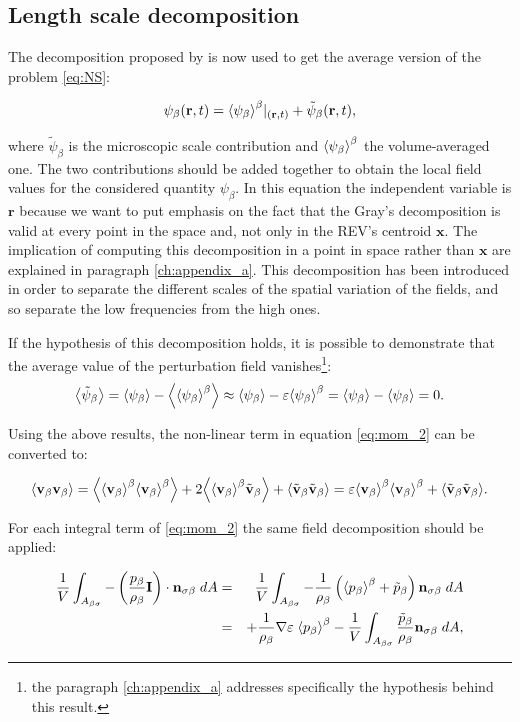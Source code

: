 \subsection{Length scale decomposition}

The decomposition proposed by \citet{gray1975derivation} is now used to get the average version of the problem \eqref{eq:NS}:

\begin{equation}
\psi_{\beta}(\mathbf{r},t) = {\left< \psi_{\beta} \right>}^{\beta}|_{(\mathbf{r},t)} + \tilde{\psi}_{\beta}(\mathbf{r},t),
\label{eq:gray}
\end{equation}

\noindent where $\tilde{\psi}_{\beta}$ is the microscopic scale contribution and $ {\left< \psi_{\beta} \right>}^{\beta}$ the volume-averaged one. The two contributions should be added together to obtain the local field values for the considered quantity $\psi_{\beta}$.
In this equation the independent variable is $\mathbf{r}$ because we want to put emphasis on the fact that the Gray's decomposition is valid at every point in the space and, not only in the REV's centroid $\mathbf{x}$. The implication of computing this decomposition in a point in space rather than $\mathbf{x}$ are explained in paragraph \ref{ch:appendix_a}.
This decomposition has been introduced in order to separate the different scales of the spatial variation of the fields, and so separate the low frequencies from the high ones.

If the hypothesis of this decomposition holds, it is possible to demonstrate that the average value of the perturbation field vanishes\footnote{the paragraph \ref{ch:appendix_a} addresses specifically the hypothesis behind this result.}:
$$
{\left< \tilde{\psi}_{\beta} \right>} = {\left< \psi_{\beta} \right>} - {\left< {\left< \psi_{\beta} \right>}^{\beta} \right>} \approx {\left< \psi_{\beta} \right>} -\varepsilon {\left< \psi_{\beta} \right>}^{\beta} = {\left< \psi_{\beta} \right>} -{\left< \psi_{\beta} \right>} = 0.
$$


Using the above results, the non-linear term in equation \eqref{eq:mom_2} can be converted to:

\begin{equation}
{\left< \textbf{v}_{\beta}\textbf{v}_{\beta}\right>} = {\left< {\left< \textbf{v}_{\beta} \right>}^{\beta}{\left< \textbf{v}_{\beta} \right>}^{\beta} \right>} +2{\left< {\left< \textbf{v}_{\beta} \right>}^{\beta}\tilde{\textbf{v}}_{\beta} \right>} +{\left< \tilde{\textbf{v}}_{\beta} \tilde{\textbf{v}}_{\beta} \right>} = \varepsilon {\left< \textbf{v}_{\beta}\right>}^{\beta}{\left< \textbf{v}_{\beta} \right>}^{\beta} +{\left< \tilde{\textbf{v}}_{\beta}\tilde{\textbf{v}}_{\beta} \right>}.
\label{eq:dec_1}
\end{equation}

For each integral term of \eqref{eq:mom_2} the same field decomposition should be applied:

\begin{eqnarray}
\dfrac{1}{V} \int_{A_{\beta \sigma}}  - \left( \dfrac{p_{\beta}}{\rho_{\beta}} \mathbf{I} \right) \cdot \mathbf{n}_{\sigma \beta} \;dA &=& \dfrac{1}{V} \int_{A_{\beta \sigma}}  -\dfrac{1}{\rho_{\beta}} \left({\left< p_{\beta} \right>}^{\beta}   + \tilde{p}_{\beta} \right)  \mathbf{n}_{\sigma \beta} \;dA  \nonumber \\
&=& +\dfrac{1}{\rho_{\beta}}\nabla\varepsilon \; {\left< p_{\beta} \right>}^{\beta} - \dfrac{1}{V} \int_{A_{\beta \sigma}}  \dfrac{\tilde{p}_{\beta}}{\rho_{\beta}}  \mathbf{n}_{\sigma \beta} \;dA,
\end{eqnarray}


